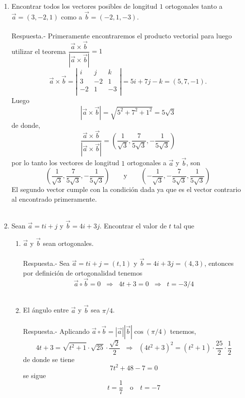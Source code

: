 \begin{enumerate}
\item Encontrar todos los vectores posibles de longitud $1$ ortogonales tanto a $\vec{a}=(3,-2,1)$ como a $\vec{b}=(-2,1,-3)$.\\\\
    Respuesta.-\;  Primeramente encontraremos el producto vectorial para luego utilizar el teorema $\dfrac{\vec{a}\times \vec{b}}{|\vec{a}\times \vec{b}|}=1$
    $$\vec{a}\times \vec{b} = \left|\begin{array}{rrr}
	i&j&k\\
	3&-2&1\\
	-2&1&-3\\
    \end{array}\right|=5i+7j-k=(5,7,-1).$$
    Luego $$|\vec{a}\times \vec{b}|=\sqrt{5^2+7^2+1^2}=5\sqrt{3}$$
    de donde, $$\dfrac{\vec{a}\times \vec{b}}{|\vec{a}\times \vec{b}|}=\left(\dfrac{1}{\sqrt{3}},\dfrac{7}{5\sqrt{3}},-\dfrac{1}{5\sqrt{3}}\right)$$
    por lo tanto los vectores de longitud $1$ ortogonales a $\vec{a}$ y $\vec{b}$, son $$\left(\dfrac{1}{\sqrt{3}},\dfrac{7}{5\sqrt{3}},-\dfrac{1}{5\sqrt{3}}\right) \qquad \mbox{y}\qquad \left(-\dfrac{1}{\sqrt{3}},-\dfrac{7}{5\sqrt{3}},\dfrac{1}{5\sqrt{3}}\right)$$
    El segundo vector cumple con la condición dada ya que es el vector contrario al encontrado primeramente.\\\\

\item Sean $\vec{a}=ti + j$ y $\vec{b}=4i+3j$. Encontrar el valor de $t$ tal que 
\begin{enumerate}[\bfseries a)]
    
    \item $\vec{a}$ y $\vec{b}$ sean ortogonales.\\\\
	Respuesta.-\; Sea $\vec{a}=ti + j=(t,1)$ y $\vec{b}=4i+3j=(4,3)$, entonces por definición de ortogonalidad tenemos 
	$$\vec{a}\circ \vec{b} = 0 \;\; \Longrightarrow \; \; 4t+3=0 \;\; \Longrightarrow \; \; t=-3/4$$\\

    \item El ángulo entre $\vec{a}$ y $\vec{b}$ sea $\pi/4$.\\\\
	Respuesta.-\; Aplicando $\vec{a}\circ \vec{b}=|\vec{a}||\vec{b}|\cos(\pi/4)$ tenemos, 
	$$4t+3=\sqrt{t^2+1}\cdot \sqrt{25}\cdot \dfrac{\sqrt{2}}{2} \;\; \Longrightarrow \; \; (4t^2+3)^2=(t^2+1)\cdot\dfrac{25}{2}\cdot \dfrac{1}{2}$$
	de donde se tiene $$7t^2+48-7=0$$
	se sigue $$t=\dfrac{1}{7} \quad \mbox{o}\quad t=-7$$\\


\end{enumerate}
\end{enumerate}
